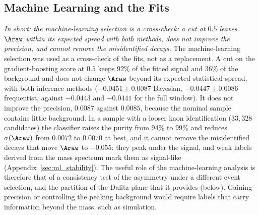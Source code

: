 \subsection{Machine Learning and the Fits}
\label{sec:comparison_ml}
\emph{In short: the machine-learning selection is a cross-check: a cut at $0.5$ leaves $\Araw$ within its expected spread with both methods, does not improve the precision, and cannot remove the misidentified decays.}
The machine-learning selection was used as a cross-check of the fits, not as a replacement. A cut on the gradient-boosting score at $0.5$ keeps $92\%$ of the fitted signal and $36\%$ of the background and does not change $\Araw$ beyond its expected statistical spread, with both inference methods ($-0.0451\pm0.0087$ Bayesian, $-0.0447\pm0.0086$ frequentist, against $-0.0443$ and $-0.0441$ for the full window). It does not improve the precision, $0.0087$ against $0.0085$, because the nominal sample contains little background. In a sample with a looser kaon identification ($33{,}328$ candidates) the classifier raises the purity from $94\%$ to $99\%$ and reduces $\sigma(\Araw)$ from $0.0072$ to $0.0070$ at best, and it cannot remove the misidentified decays that move $\Araw$ to $-0.055$: they peak under the signal, and weak labels derived from the mass spectrum mark them as signal-like (Appendix~\ref{sec:ml_stability}). The useful role of the machine-learning analysis is therefore that of a consistency test of the asymmetry under a different event selection, and the partition of the Dalitz plane that it provides (below). Gaining precision or controlling the peaking background would require labels that carry information beyond the mass, such as simulation.

